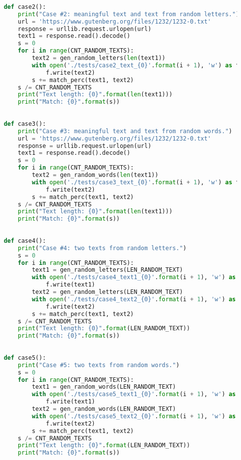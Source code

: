 \documentclass[12pt]{article}
\begin{document}
\begin{lstlisting}[language=Python]
    
    def case2():
        print("Case #2: meaningful text and text from random letters.")
        url = 'https://www.gutenberg.org/files/1232/1232-0.txt'
        response = urllib.request.urlopen(url)
        text1 = response.read().decode()
        s = 0
        for i in range(CNT_RANDOM_TEXTS):
            text2 = gen_random_letters(len(text1))
            with open('./tests/case2_text_{0}'.format(i + 1), 'w') as f:
                f.write(text2)
            s += match_perc(text1, text2)
        s /= CNT_RANDOM_TEXTS
        print("Text length: {0}".format(len(text1)))
        print("Match: {0}".format(s))
    
    
    def case3():
        print("Case #3: meaningful text and text from random words.")
        url = 'https://www.gutenberg.org/files/1232/1232-0.txt'
        response = urllib.request.urlopen(url)
        text1 = response.read().decode()
        s = 0
        for i in range(CNT_RANDOM_TEXTS):
            text2 = gen_random_words(len(text1))
            with open('./tests/case3_text_{0}'.format(i + 1), 'w') as f:
                f.write(text2)
            s += match_perc(text1, text2)
        s /= CNT_RANDOM_TEXTS
        print("Text length: {0}".format(len(text1)))
        print("Match: {0}".format(s))
    
    
    def case4():
        print("Case #4: two texts from random letters.")
        s = 0
        for i in range(CNT_RANDOM_TEXTS):
            text1 = gen_random_letters(LEN_RANDOM_TEXT)
            with open('./tests/case4_text1_{0}'.format(i + 1), 'w') as f:
                f.write(text1)
            text2 = gen_random_letters(LEN_RANDOM_TEXT)
            with open('./tests/case4_text2_{0}'.format(i + 1), 'w') as f:
                f.write(text2)
            s += match_perc(text1, text2)
        s /= CNT_RANDOM_TEXTS
        print("Text length: {0}".format(LEN_RANDOM_TEXT))
        print("Match: {0}".format(s))
    
    
    def case5():
        print("Case #5: two texts from random words.")
        s = 0
        for i in range(CNT_RANDOM_TEXTS):
            text1 = gen_random_words(LEN_RANDOM_TEXT)
            with open('./tests/case5_text1_{0}'.format(i + 1), 'w') as f:
                f.write(text1)
            text2 = gen_random_words(LEN_RANDOM_TEXT)
            with open('./tests/case5_text2_{0}'.format(i + 1), 'w') as f:
                f.write(text2)
            s += match_perc(text1, text2)
        s /= CNT_RANDOM_TEXTS
        print("Text length: {0}".format(LEN_RANDOM_TEXT))
        print("Match: {0}".format(s))
    

\end{lstlisting}
\end{document}
